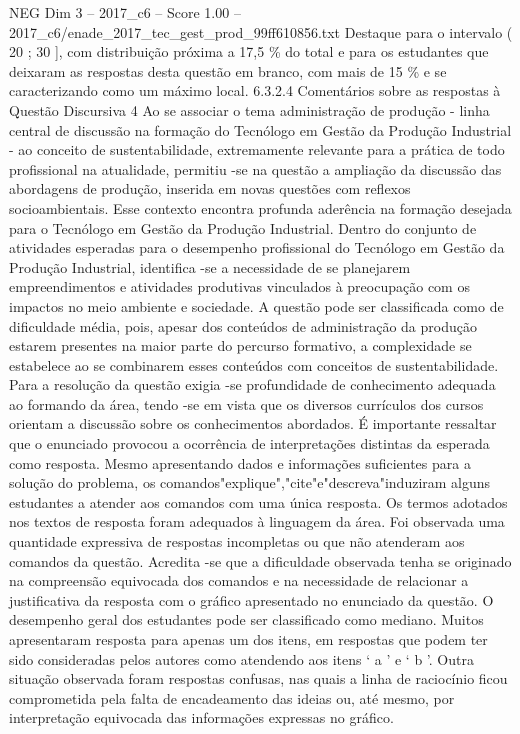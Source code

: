 \begin{textsample}{NEG Dim 3 – 2017\_c6 – Score 1.00 – 2017\_c6/enade\_2017\_tec\_gest\_prod\_99ff610856.txt}
Destaque para o intervalo ( 20 ; 30 ], com distribuição próxima a 17,5 \% do total e para os estudantes que deixaram as respostas desta questão em branco, com mais de 15 \% e se caracterizando como um máximo local. 6.3.2.4 Comentários sobre as respostas à Questão Discursiva 4 Ao se associar o tema administração de produção - linha central de discussão na formação do Tecnólogo em Gestão da Produção Industrial - ao conceito de sustentabilidade, extremamente relevante para a prática de todo profissional na atualidade, permitiu -se na questão a ampliação da discussão das abordagens de produção, inserida em novas questões com reflexos socioambientais.
Esse contexto encontra profunda aderência na formação desejada para o Tecnólogo em Gestão da Produção Industrial.
Dentro do conjunto de atividades esperadas para o desempenho profissional do Tecnólogo em Gestão da Produção Industrial, identifica -se a necessidade de se planejarem empreendimentos e atividades produtivas vinculados à preocupação com os impactos no meio ambiente e sociedade.
A questão pode ser classificada como de dificuldade média, pois, apesar dos conteúdos de administração da produção estarem presentes na maior parte do percurso formativo, a complexidade se estabelece ao se combinarem esses conteúdos com conceitos de sustentabilidade.
Para a resolução da questão exigia -se profundidade de conhecimento adequada ao formando da área, tendo -se em vista que os diversos currículos dos cursos orientam a discussão sobre os conhecimentos abordados.
É importante ressaltar que o enunciado provocou a ocorrência de interpretações distintas da esperada como resposta.
Mesmo apresentando dados e informações suficientes para a solução do problema, os comandos"explique","cite"e"descreva"induziram alguns estudantes a atender aos comandos com uma única resposta.
Os termos adotados nos textos de resposta foram adequados à linguagem da área.
Foi observada uma quantidade expressiva de respostas incompletas ou que não atenderam aos comandos da questão.
Acredita -se que a dificuldade observada tenha se originado na compreensão equivocada dos comandos e na necessidade de relacionar a justificativa da resposta com o gráfico apresentado no enunciado da questão.
O desempenho geral dos estudantes pode ser classificado como mediano.
Muitos apresentaram resposta para apenas um dos itens, em respostas que podem ter sido consideradas pelos autores como atendendo aos itens ‘ a ’ e ‘ b ’.
Outra situação observada foram respostas confusas, nas quais a linha de raciocínio ficou comprometida pela falta de encadeamento das ideias ou, até mesmo, por interpretação equivocada das informações expressas no gráfico.

\end{textsample}
